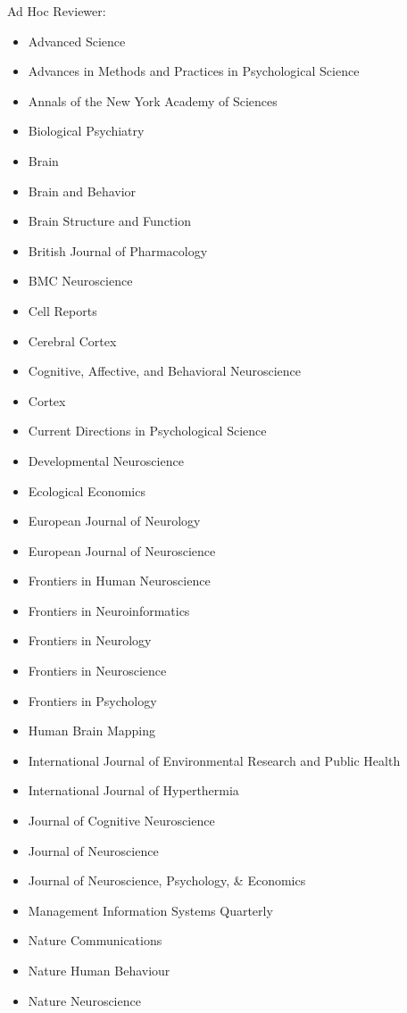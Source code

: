 \documentclass[11pt, letterpaper]{article}
\begin{document}
Ad Hoc Reviewer:
\begin{multicols}{2}
\begin{itemize}[noitemsep]
\itshape
\item Advanced Science
\item Advances in Methods and Practices in Psychological Science
\item Annals of the New York Academy of Sciences
\item Biological Psychiatry
\item Brain
\item Brain and Behavior
\item Brain Structure and Function
\item British Journal of Pharmacology
\item BMC Neuroscience 
\item Cell Reports
\item Cerebral Cortex 
\item Cognitive, Affective, and Behavioral Neuroscience 
\item Cortex
\item Current Directions in Psychological Science
\item Developmental Neuroscience 
\item Ecological Economics
\item European Journal of Neurology
\item European Journal of Neuroscience
\item Frontiers in Human Neuroscience 
\item Frontiers in Neuroinformatics 
\item Frontiers in Neurology 
\item Frontiers in Neuroscience 
\item Frontiers in Psychology 
\item Human Brain Mapping 
\item International Journal of Environmental Research and Public Health
\item International Journal of Hyperthermia 
\item Journal of Cognitive Neuroscience 
\item Journal of Neuroscience 
\item Journal of Neuroscience, Psychology, \& Economics
\item Management Information Systems Quarterly 
\item Nature Communications 
\item Nature Human Behaviour 
\item Nature Neuroscience

\end{itemize}
\end{multicols}
\end{document}
